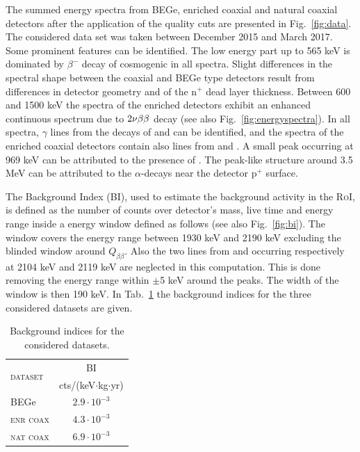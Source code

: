 The summed energy spectra from BEGe, enriched coaxial and natural coaxial detectors after the application of the quality cuts are presented in Fig.~\ref{fig:data}. The considered data set was taken between December 2015 and March 2017. Some prominent features can be identified. The low energy part up to 565 keV is dominated by $\beta^-$ decay of cosmogenic  in all spectra. Slight differences in the spectral shape between the coaxial and BEGe type detectors result from differences in detector geometry and of the n$^+$ dead layer thickness. Between 600 and 1500 keV the spectra of the enriched detectors exhibit an enhanced continuous spectrum due to $2\nu\beta\beta$ decay (see also Fig.~\ref{fig:energyspectra}). In all spectra, $\gamma$ lines from the decays of  and  can be identified, and the spectra of the enriched coaxial detectors contain also lines from  and . A small peak occurring at 969 keV can be attributed to the presence of . The peak-like structure around 3.5 MeV can be attributed to the $\alpha$-decays near the detector p$^+$ surface.

 The Background Index (BI), used to estimate the background activity in the \textsc{RoI}, is defined as the number of counts over detector's mass, live time and energy range inside a energy window defined as follows (see also Fig.~\ref{fig:bi}). The window covers the energy range between 1930 keV and 2190 keV excluding the blinded window around $Q_{\beta\beta}$. Also the two lines from  and  occurring respectively at 2104 keV and 2119 keV are neglected in this computation. This is done removing the energy range within $\pm$5 keV around the peaks. The width of the window is then 190 keV. In Tab.~\ref{tab:bindex} the background indices for the three considered datasets are given.
\begin{table}[b]
	\centering
	\caption{Background indices for the considered datasets.}
	\label{tab:bindex}
	\begin{tabular}{lc}
		\toprule
		\multirow{2}{*}{\textsc{dataset}}	&	BI \\
											&	cts/(keV$\cdot$kg$\cdot$yr) \\
		\midrule
		BEGe								&	$2.9\cdot10^{-3}$	\\
		\textsc{enr coax}					&	$4.3\cdot10^{-3}$	\\
		\textsc{nat coax}					&	$6.9\cdot10^{-3}$	\\
		\bottomrule
	\end{tabular}
\end{table}

